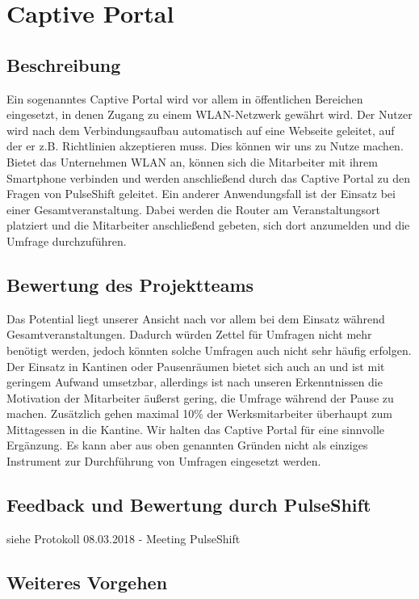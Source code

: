 \section{Captive Portal}


\subsection{Beschreibung}
Ein sogenanntes Captive Portal wird vor allem in öffentlichen Bereichen eingesetzt, in denen Zugang zu einem WLAN-Netzwerk gewährt wird. Der Nutzer wird nach dem Verbindungsaufbau automatisch auf eine Webseite geleitet, auf der er z.B. Richtlinien akzeptieren muss. Dies können wir uns zu Nutze machen. Bietet das Unternehmen WLAN an, können sich die Mitarbeiter mit ihrem Smartphone verbinden und werden anschließend durch das Captive Portal zu den Fragen von PulseShift geleitet. Ein anderer Anwendungsfall ist der Einsatz bei einer Gesamtveranstaltung. Dabei werden die Router am Veranstaltungsort platziert und die Mitarbeiter anschließend gebeten, sich dort anzumelden und die Umfrage durchzuführen.

\subsection{Bewertung des Projektteams}
Das Potential liegt unserer Ansicht nach vor allem bei dem Einsatz während Gesamtveranstaltungen. Dadurch würden Zettel für Umfragen nicht mehr benötigt werden, jedoch könnten solche Umfragen auch nicht sehr häufig erfolgen. Der Einsatz in Kantinen oder Pausenräumen bietet sich auch an und ist mit geringem Aufwand umsetzbar, allerdings ist nach unseren Erkenntnissen die Motivation der Mitarbeiter äußerst gering, die Umfrage während der Pause zu machen. Zusätzlich gehen maximal 10\% der Werksmitarbeiter überhaupt zum Mittagessen in die Kantine.
Wir halten das Captive Portal für eine sinnvolle Ergänzung. Es kann aber aus oben genannten Gründen nicht als einziges Instrument zur Durchführung von Umfragen eingesetzt werden.

\subsection{Feedback und Bewertung durch PulseShift}

siehe Protokoll 08.03.2018 - Meeting PulseShift

\subsection{Weiteres Vorgehen}
